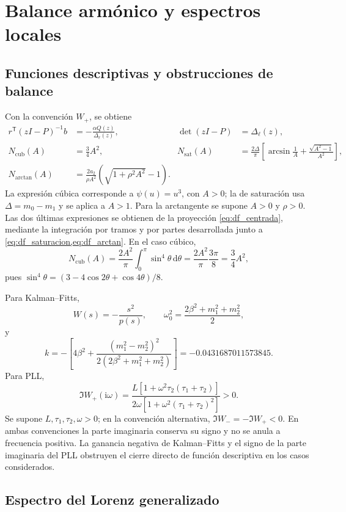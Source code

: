 \section{Balance armónico y espectros locales}
\label{app:wolfram-master}

\subsection{Funciones descriptivas y obstrucciones de balance}

Con la convención \(W_+\), se obtiene
\begin{align}
 r^{\mathsf T}(zI-P)^{-1}b
 &=-\frac{\alpha Q(z)}{\Delta_\ell(z)},&
 \det(zI-P)&=\Delta_\ell(z),\\
 N_{\mathrm{cub}}(A)&=\frac34A^2,&
 N_{\mathrm{sat}}(A)
 &=\frac{2\Delta}{\pi}
 \left[
 \arcsin\frac1A+\frac{\sqrt{A^2-1}}{A^2}
 \right],\\
 N_{\arctan}(A)&=
 \frac{2a_2}{\rho A^2}
 \left(\sqrt{1+\rho^2A^2}-1\right).
\end{align}
La expresión cúbica corresponde a \(\psi(u)=u^3\), con \(A>0\); la de
saturación usa \(\Delta=m_0-m_1\) y se aplica a \(A>1\). Para la arctangente se supone
\(A>0\) y \(\rho>0\). Las dos últimas expresiones se obtienen de la
proyección \cref{eq:df_centrada}, mediante la integración por tramos y por
partes desarrollada junto a \cref{eq:df_saturacion,eq:df_arctan}.
En el caso cúbico,
\[
 N_{\mathrm{cub}}(A)=\frac{2A^2}{\pi}\int_0^\pi\sin^4\theta\,\mathrm d\theta
 =\frac{2A^2}{\pi}\frac{3\pi}{8}=\frac34A^2,
\]
pues \(\sin^4\theta=(3-4\cos2\theta+\cos4\theta)/8\).

Para Kalman--Fitts,
\[
 W(s)=-\frac{s^2}{p(s)},\qquad
 \omega_0^2=\frac{2\beta^2+m_1^2+m_2^2}{2},
\]
y
\[
 k=-\left[
 4\beta^2+
 \frac{(m_1^2-m_2^2)^2}
 {2(2\beta^2+m_1^2+m_2^2)}
 \right]
 =-0.0431687011573845.
\]
Para PLL,
\[
 \Im W_+(\mathrm i\omega)=
 \frac{L[1+\omega^2\tau_2(\tau_1+\tau_2)]}
 {2\omega[1+\omega^2(\tau_1+\tau_2)^2]}>0.
\]
Se supone \(L,\tau_1,\tau_2,\omega>0\); en la convención alternativa,
\(\Im W_-=-\Im W_+<0\). En ambas convenciones la parte imaginaria conserva
su signo y no se anula a frecuencia positiva.
La ganancia negativa de Kalman--Fitts y el signo de la parte imaginaria
del PLL obstruyen el cierre directo de función descriptiva en los casos
considerados.

\subsection{Espectro del Lorenz generalizado}

